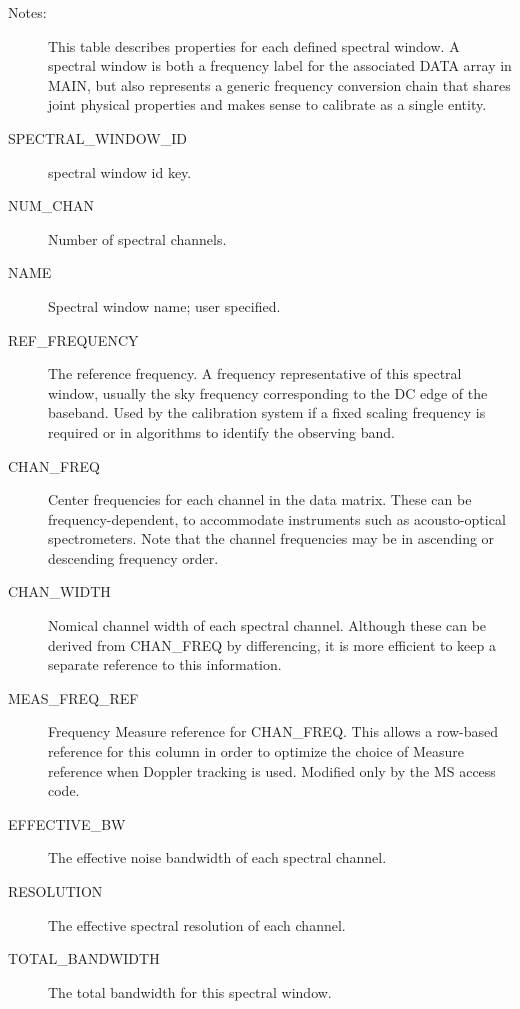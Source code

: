 \documentclass{article}
\begin{document}
\begin{description}

 \item[Notes:] This table describes properties for each defined
spectral window. A spectral window is both a frequency label for the
associated DATA array in MAIN, but also represents a generic frequency
conversion chain that shares joint physical properties and makes sense
to calibrate as a single entity.
\item[SPECTRAL\_WINDOW\_ID] spectral window id key.

\item[NUM\_CHAN] Number of spectral channels.

\item[NAME] Spectral window name; user specified.

\item[REF\_FREQUENCY] The reference frequency. A frequency
representative of this spectral window, usually the sky frequency
corresponding to the DC edge of the baseband. Used by the calibration
system if a fixed scaling frequency is required or in algorithms to
identify the observing band.

\item[CHAN\_FREQ] Center frequencies for each channel in the data
matrix. These can be frequency-dependent, to accommodate instruments
such as acousto-optical spectrometers. Note that the channel
frequencies may be in ascending or descending frequency order.

\item[CHAN\_WIDTH] Nomical channel width of each spectral
channel. Although these can be derived from CHAN\_FREQ by
differencing, it is more efficient to keep a separate reference to
this information.

\item[MEAS\_FREQ\_REF] Frequency Measure reference for
CHAN\_FREQ. This allows a row-based reference for this column in order to
optimize the choice of Measure reference when Doppler tracking is
used. Modified only by the MS access code.

\item[EFFECTIVE\_BW] The effective noise bandwidth of each spectral channel.

\item[RESOLUTION] The effective spectral resolution of each channel.

\item[TOTAL\_BANDWIDTH] The total bandwidth for this spectral window.


\end{description}
\end{document}
